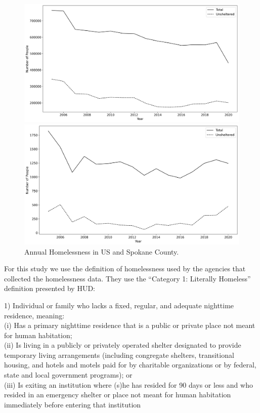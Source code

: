 \documentclass[utf8]{frontiersFPHY} %
\begin{document}
\begin{figure}[H]
    \begin{minipage}{0.5\textwidth}
        \includegraphics[width=\textwidth]{../img/homelessness_usa.png} 
    \end{minipage}
    \begin{minipage}{0.5\textwidth}
        \includegraphics[width=\textwidth]{../img/homelessness_spokane.png}
    \end{minipage}
    \caption[Annual Homelessness in US and Spokane County]{Annual Homelessness in US and Spokane County.
    \cite{PITcount}}
    \label{fig:Homeless_US_Spokane}
\end{figure}

For this study we use the definition of homelessness used by the agencies that collected the homelessness data. They use the ``Category 1: Literally Homeless'' definition presented by HUD:
\begin{displayquote}
1) Individual or family who lacks a fixed, regular, and adequate nighttime residence, meaning: \\
(i) Has a primary nighttime residence that is a public or private place not meant for human habitation; \\
(ii) Is living in a publicly or privately operated shelter designated to provide temporary living arrangements (including congregate shelters, transitional housing, and hotels and motels paid for by charitable organizations or by federal, state and local government programs); or \\
(iii) Is exiting an institution where (s)he has resided for 90 days or less and who resided in an emergency shelter or place not meant for human habitation immediately before entering that institution
\end{displayquote}
\end{document}
